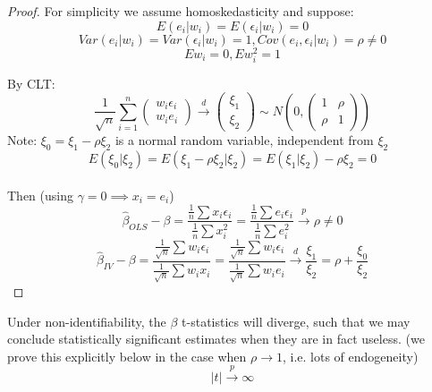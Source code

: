 \documentclass[DIV=14,titlepage=false]{scrreprt}
\begin{document}
\vspace{5mm}
\begin{proof}
For simplicity we assume homoskedasticity and suppose:
\[E(e_i|w_i)=E(\epsilon_i|w_i)=0\]
\[Var(e_i|w_i)=Var(\epsilon_i|w_i)=1, Cov(e_i,\epsilon_i|w_i)=\rho\neq0\]
\[Ew_i=0, Ew_i^2=1\] 

By CLT:
\[\frac{1}{\sqrt{n}}\sum_{i=1}^n\begin{pmatrix}w_i\epsilon_i \\ w_ie_i \end{pmatrix}\xrightarrow{d}\begin{pmatrix}\xi_1 \\ \xi_2\end{pmatrix}\sim N\left(0,\begin{pmatrix}1&\rho \\\rho & 1\end{pmatrix}\right)\]
Note: \(\xi_0=\xi_1-\rho\xi_2\) is a normal random variable, independent from \(\xi_2\)
\[E(\xi_0|\xi_2)=E(\xi_1-\rho\xi_2|\xi_2)=E(\xi_1|\xi_2)-\rho\xi_2=0\]
\\
Then (using \(\gamma=0 \implies x_i=e_i\))
\[\hat\beta_{OLS}-\beta=\frac{\frac{1}{n}\sum x_i\epsilon_i}{\frac{1}{n}\sum x_i^2}=\frac{\frac{1}{n}\sum e_i\epsilon_i}{\frac{1}{n}\sum e_i^2}\xrightarrow{p}\rho\neq0\]
\[\hat\beta_{IV}-\beta= \frac{\frac{1}{\sqrt{n}}\sum w_i\epsilon_i}{\frac{1}{\sqrt{n}}\sum w_ix_i}=\frac{\frac{1}{\sqrt{n}}\sum w_i\epsilon_i}{\frac{1}{\sqrt{n}}\sum w_ie_i}\xrightarrow{d}\frac{\xi_1}{\xi_2}=\rho+\frac{\xi_0}{\xi_2}\]
\end{proof}
\vspace{5mm}
\begin{prop}
    Under non-identifiability, the \(\beta\) t-statistics will diverge, such that we may conclude statistically significant estimates when they are in fact useless. (we prove this explicitly below in the case when \(\rho\rightarrow1\), i.e. lots of endogeneity)
    \[|t|\xrightarrow{p}\infty\]
\end{prop}
\vspace{5mm}
\end{document}
